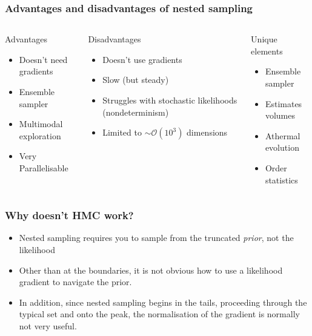 \documentclass[aspectratio=169]{beamer}
\begin{document}
\begin{frame}
    \frametitle{Advantages and disadvantages of nested sampling}
    \begin{columns}[t]
        \begin{exampleblock}{Advantages}
            \begin{itemize}
                \item Doesn't need gradients
                \item Ensemble sampler
                \item Multimodal exploration
                \item Very Parallelisable
            \end{itemize}
        \end{exampleblock}
        \begin{alertblock}{Disadvantages}
            \begin{itemize}
                \item Doesn't use gradients
                \item Slow (but steady)
                \item Struggles with stochastic likelihoods (nondeterminism)
                \item Limited to $\sim\mathcal{O}(10^3)$ dimensions
            \end{itemize}
        \end{alertblock}
        \begin{block}{Unique elements}
            \begin{itemize}
                \item Ensemble sampler
                \item Estimates volumes
                \item Athermal evolution
                \item Order statistics
            \end{itemize}
        \end{block}
    \end{columns}
\end{frame}


\begin{frame}
    \frametitle{Why doesn't HMC work?}
    \begin{itemize}
        \item Nested sampling requires you to sample from the truncated \emph{prior}, not the likelihood
        \item Other than at the boundaries, it is not obvious how to use a likelihood gradient to navigate the prior.
        \item In addition, since nested sampling begins in the tails, proceeding through the typical set and onto the peak, the normalisation of the gradient is normally not very useful.
    \end{itemize}
\end{frame}
\end{document}
